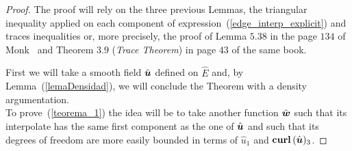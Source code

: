 \begin{proof}
The proof will rely on the three previous Lemmas, 
the triangular inequality applied on each component of 
expression~(\ref{edge_interp_explicit}) and traces inequalities or,
more precisely, the proof
of Lemma $5.38$ in the page $134$ of Monk~\cite{monk}
and Theorem $3.9$ (\emph{Trace Theorem})
in page $43$ of
the same book.


First we will take a smooth field $\hat{\boldsymbol{u}}$ defined on $\hat{E}$
and, by Lemma~(\ref{lemaDensidad}), we will conclude the Theorem 
with a density argumentation.\\[4pt]
To prove~(\ref{teorema_1}) the idea will be to take another function
$\hat{\boldsymbol{w}}$ such that its interpolate has the same first component
as the one of $\hat{\boldsymbol{u}}$ and such that its degrees of freedom are
more easily bounded in terms of $\hat{u}_1$ and $\textbf{curl\,}(\hat{\boldsymbol{u}})_3$.


\end{proof}
